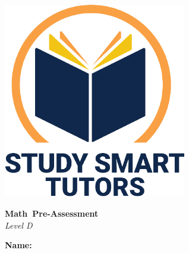 \documentclass[12pt]{article}
\title{}
\date{}
\newcommand{\subject}{Math}
\newcommand{\assessmenttype}{Pre-Assessment}
\newcommand{\levelLetter}{D}
\begin{document}
\thispagestyle{empty}

\vspace*{\fill}

\vspace*{3cm}

\begin{center}

    \includegraphics[width=0.6\textwidth]{SST_Color_Logo.png} %
    
    \vspace{1cm} %
    
    
    \Huge \textbf{ \subject \ \assessmenttype }\\ 
     \vspace{1 cm}
      \LARGE \textit{Level \levelLetter}\\[1cm]
 \vspace{0.5cm}
    
   


    \LARGE \textbf{Name:} \underline{\hspace{8cm}}

    
    \vfill %
    
\end{center}


\newpage
\thispagestyle{empty}
\vspace*{\fill}
\newpage


\newpage


\end{document}
